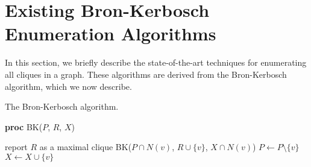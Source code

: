 \documentclass[final,1p]{elsarticle-modified}
\begin{document}


\section{Existing Bron-Kerbosch Enumeration Algorithms}
\label{section:bron-kerbosch}
In this section, we briefly describe the state-of-the-art techniques for enumerating all cliques in a graph. These algorithms are derived from the Bron-Kerbosch algorithm, which we now describe.

\begin{algorithm}[!htb]
\caption{The Bron-Kerbosch algorithm.}
{\bf proc} BK($P$, $R$, $X$)
\begin{algorithmic}[1]
    \State report $R$ as a maximal clique
\EndIf
{}
    \State BK($P\cap N(v)$, $R\cup\{v\}$, $X\cap N(v)$)
    \State $P \leftarrow P \setminus \{v\}$
    \State $X \leftarrow X \cup \{v\}$
\EndFor
\end{algorithmic}
\label{algorithm:bron-kerbosh}
\end{algorithm}
\end{document}
